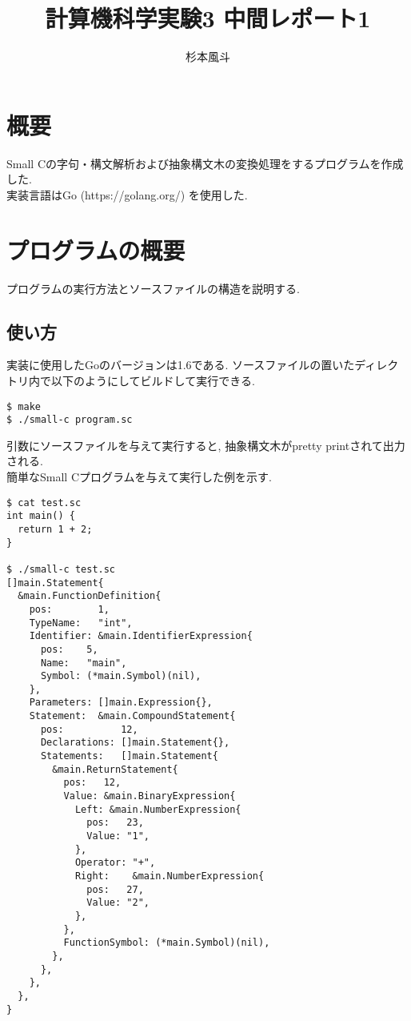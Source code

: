 \documentclass[a4j]{jarticle}
\begin{document}
\title{計算機科学実験3 中間レポート1}
\author{杉本風斗}

\maketitle

\section{概要}
Small Cの字句・構文解析および抽象構文木の変換処理をするプログラムを作成した. \\
実装言語はGo (https://golang.org/) を使用した.

\section{プログラムの概要}
プログラムの実行方法とソースファイルの構造を説明する. \\

\subsection{使い方}
実装に使用したGoのバージョンは1.6である. ソースファイルの置いたディレクトリ内で以下のようにしてビルドして実行できる. \\

\begin{verbatim}
$ make
$ ./small-c program.sc
\end{verbatim}

引数にソースファイルを与えて実行すると, 抽象構文木がpretty printされて出力される. \\
簡単なSmall Cプログラムを与えて実行した例を示す.

\begin{verbatim}
$ cat test.sc
int main() {
  return 1 + 2;
}

$ ./small-c test.sc
[]main.Statement{
  &main.FunctionDefinition{
    pos:        1,
    TypeName:   "int",
    Identifier: &main.IdentifierExpression{
      pos:    5,
      Name:   "main",
      Symbol: (*main.Symbol)(nil),
    },
    Parameters: []main.Expression{},
    Statement:  &main.CompoundStatement{
      pos:          12,
      Declarations: []main.Statement{},
      Statements:   []main.Statement{
        &main.ReturnStatement{
          pos:   12,
          Value: &main.BinaryExpression{
            Left: &main.NumberExpression{
              pos:   23,
              Value: "1",
            },
            Operator: "+",
            Right:    &main.NumberExpression{
              pos:   27,
              Value: "2",
            },
          },
          FunctionSymbol: (*main.Symbol)(nil),
        },
      },
    },
  },
}
\end{verbatim}
\end{document}
